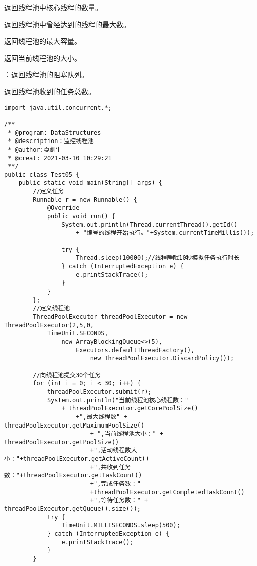 \documentclass[a4paper]{report}
\begin{document}
返回线程池中核心线程的数量。

返回线程池中曾经达到的线程的最大数。

返回线程池的最大容量。

返回当前线程池的大小。

：返回线程池的阻塞队列。

返回线程池收到的任务总数。

\begin{Verbatim}[frame=single,numbersep=5pt,xleftmargin=1.5em,xrightmargin=1.5em]
import java.util.concurrent.*;

/**
 * @program: DataStructures
 * @description：监控线程池
 * @author:戛剑生
 * @creat: 2021-03-10 10:29:21
 **/
public class Test05 {
    public static void main(String[] args) {
        //定义任务
        Runnable r = new Runnable() {
            @Override
            public void run() {
                System.out.println(Thread.currentThread().getId()
                    + "编号的线程开始执行。"+System.currentTimeMillis());

                try {
                    Thread.sleep(10000);//线程睡眠10秒模拟任务执行时长
                } catch (InterruptedException e) {
                    e.printStackTrace();
                }
            }
        };
        //定义线程池
        ThreadPoolExecutor threadPoolExecutor = new ThreadPoolExecutor(2,5,0,
            TimeUnit.SECONDS,
                new ArrayBlockingQueue<>(5),
                    Executors.defaultThreadFactory(),
                        new ThreadPoolExecutor.DiscardPolicy());

        //向线程池提交30个任务
        for (int i = 0; i < 30; i++) {
            threadPoolExecutor.submit(r);
            System.out.println("当前线程池核心线程数："
                + threadPoolExecutor.getCorePoolSize()
                    +",最大线程数" + threadPoolExecutor.getMaximumPoolSize()
                        + ",当前线程池大小：" + threadPoolExecutor.getPoolSize()
                        +",活动线程数大小："+threadPoolExecutor.getActiveCount()
                        +",共收到任务数："+threadPoolExecutor.getTaskCount()
                        +",完成任务数："
                        +threadPoolExecutor.getCompletedTaskCount()
                        +",等待任务数：" + threadPoolExecutor.getQueue().size());
            try {
                TimeUnit.MILLISECONDS.sleep(500);
            } catch (InterruptedException e) {
                e.printStackTrace();
            }
        }


\end{Verbatim}
\end{document}
